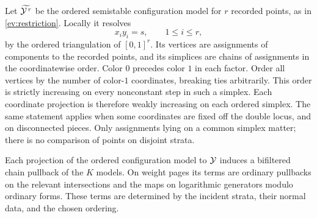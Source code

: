 Let $\widetilde{\mathcal Y^{\,r}}$ be the ordered semistable configuration model for
$r$ recorded points, as in \cref{ev:restriction}.  Locally it resolves
\[
 x_i y_i=s,\qquad 1\leq i\leq r,
\]
by the ordered triangulation of $[0,1]^r$.  Its vertices are assignments of
components to the recorded points, and its simplices are chains of assignments
in the coordinatewise order.  Color $0$ precedes color $1$ in each factor.
Order all vertices by the number of color-$1$ coordinates, breaking ties
arbitrarily.  This order is strictly increasing on every nonconstant step in
such a simplex.  Each coordinate projection is therefore weakly increasing
on each ordered simplex.  The same statement applies when some coordinates
are fixed off the double locus, and on disconnected pieces.  Only assignments
lying on a common simplex matter; there is no comparison of points on
disjoint strata.

\begin{lemma}\label{fp:pullback}
Each projection of the ordered configuration model to $\mathcal Y$ induces a
bifiltered chain pullback of the $K$ models.  On weight pages its terms are
ordinary pullbacks on the relevant intersections and the maps on logarithmic
generators modulo ordinary forms.  These terms are determined by the incident
strata, their normal data, and the chosen ordering.
\end{lemma}

